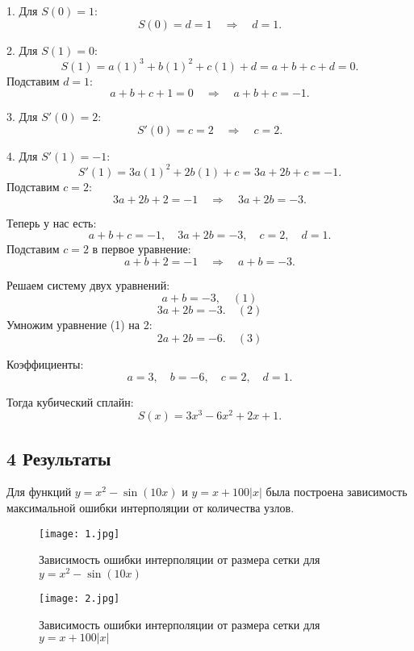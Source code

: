 \documentclass[12pt]{article}
\begin{document}
1. Для \( S(0) = 1 \):
\[
S(0) = d = 1 \quad \Rightarrow \quad d = 1.
\]

2. Для \( S(1) = 0 \):
\[
S(1) = a (1)^3 + b (1)^2 + c (1) + d = a + b + c + d = 0.
\]
Подставим \( d = 1 \):
\[
a + b + c + 1 = 0 \quad \Rightarrow \quad a + b + c = -1.
\]

3. Для \( S'(0) = 2 \):
\[
S'(0) = c = 2 \quad \Rightarrow \quad c = 2.
\]

4. Для \( S'(1) = -1 \):
\[
S'(1) = 3a (1)^2 + 2b (1) + c = 3a + 2b + c = -1.
\]
Подставим \( c = 2 \):
\[
3a + 2b + 2 = -1 \quad \Rightarrow \quad 3a + 2b = -3.
\]

Теперь у нас есть:
\[
a + b + c = -1, \quad 3a + 2b = -3, \quad c = 2, \quad d = 1.
\]
Подставим \( c = 2 \) в первое уравнение:
\[
a + b + 2 = -1 \quad \Rightarrow \quad a + b = -3.
\]

Решаем систему двух уравнений:
\[
a + b = -3, \quad (1)
\]
\[
3a + 2b = -3. \quad (2)
\]
Умножим уравнение (1) на 2:
\[
2a + 2b = -6. \quad (3)
\]

Коэффициенты:
\[
a = 3, \quad b = -6, \quad c = 2, \quad d = 1.
\]

Тогда кубический сплайн:
\[
S(x) = 3x^3 - 6x^2 + 2x + 1.
\]



\subsection*{4 Результаты}
Для функций \( y = x^2 - \sin(10x) \) и \(y = x+100|x|\) была построена зависимость максимальной ошибки интерполяции от количества узлов.

\begin{figure}[h!] %
    \centering %
    \texttt{[image: 1.jpg]} %
    \caption{Зависимость ошибки интерполяции от размера сетки для \( y = x^2 - \sin(10x) \)}
    \label{fig:error} %
\end{figure}

\begin{figure}[h!] %
    \centering %
    \texttt{[image: 2.jpg]} %
    \caption{Зависимость ошибки интерполяции от размера сетки для \( y=x+100|x| \)} %
    \label{fig:error} %
\end{figure}
\end{document}
